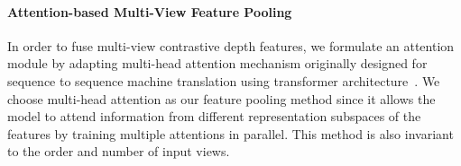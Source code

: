 

\paragraph{Attention-based Multi-View Feature Pooling}\vspace{-4mm}
In order to fuse multi-view contrastive depth features, we formulate an attention module by adapting multi-head attention mechanism originally designed for sequence to sequence machine translation using transformer architecture~\cite{vaswani2017attention}.
We choose multi-head attention as our feature pooling method since it allows the model to attend information from different representation subspaces of the features by training multiple attentions in parallel.
This method is also invariant to the order and number of input views.

